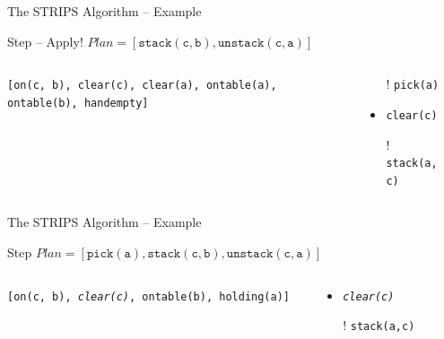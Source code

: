 \documentclass[presentation]{beamer}\mode<presentation>{\usetheme{AMSBolognaFC}}
\begin{document}
\begin{frame}[c]{The STRIPS Algorithm -- Example}
\small

\begin{exampleblock}{Step \nextStripsExampleStep{} -- Apply! \hfill $Plan = [\mathtt{stack(c,b),unstack(c,a)}]$}
	\begin{columns}[t]
		\begin{column}{.30\linewidth}\centering
			\texttt{[on(c, b), clear(c), clear(a), ontable(a), ontable(b), handempty]}
		\end{column}
		\begin{column}{.50\linewidth}\centering
			\begin{itemize}
				\item[!] \texttt{pick(a)}
				\item \texttt{clear(c)}
				\item[!] \texttt{stack(a,c)}
			\end{itemize}
		\end{column}
		\begin{column}{.10\linewidth}\centering
			
		\end{column}
	\end{columns}
\end{exampleblock}

\end{frame}


\begin{frame}[c]{The STRIPS Algorithm -- Example}
\small

\begin{exampleblock}{Step \nextStripsExampleStep{} \hfill $Plan = [\mathtt{pick(a),stack(c,b),unstack(c,a)}]$}
	\begin{columns}[t]
		\begin{column}{.30\linewidth}\centering
			\alert{\texttt{[on(c, b), \emph{clear(c)}, ontable(b), holding(a)]}}
		\end{column}
		\begin{column}{.50\linewidth}\centering
			\begin{itemize}
				\item \alert{\emph{\texttt{clear(c)}}}
				\item[!] \texttt{stack(a,c)}
			\end{itemize}
		\end{column}
		\begin{column}{.10\linewidth}\centering
			
		\end{column}
	\end{columns}
\end{exampleblock}

\end{frame}
\end{document}
